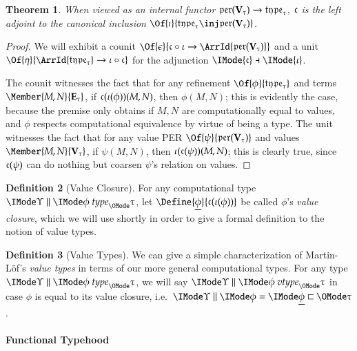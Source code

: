 \documentclass[11pt]{article}
\newtheorem{thm}{Theorem}[section]
\theoremstyle{definition}
\newtheorem{definition}[thm]{Definition}
\theoremstyle{notation}
\theoremstyle{remark}
\numberwithin{equation}{section}
\newcommand\Exprs{\mathbf{E}}
\newcommand\Values{\mathbf{V}}
\begin{document}
\begin{thm}
When viewed as an internal functor
$\PERs{\Values_\tau}\to\Types{\tau}$, $\mathfrak{c}$ is the left adjoint to
the canonical inclusion
$\Of{\iota}{\Types{\tau}\inj\PERs{\Values_\tau}}$.
\end{thm}
\begin{proof}
  We will exhibit a counit $\Of{\epsilon}{\VToCType\circ\iota\to
  \ArrId{\PERs{\Values_\tau}}}$ and a unit
  $\Of{\eta}{\ArrId{\Types{\tau}}\to\iota\circ\VToCType}$ for
  the adjunction $\IMode{\VToCType}\dashv\IMode{\iota}$.

  The counit witnesses the fact that for any refinement
  $\Of{\phi}{\Types{\tau}}$ and terms $\Member{M,N}{\Exprs_\tau}$, if
  $\mathfrak{c}(\iota(\phi))(M,N)$, then $\phi(M,N)$; this is evidently the case,
  because the premise only obtains if $M,N$ are computationally equal to
  values, and $\phi$ respects computational equivalence by virtue of being a
  type.  The unit witnesses the fact that for any value PER
  $\Of{\psi}{\PERs{\Values_\tau}}$ and values $\Member{M,N}{\Values_\tau}$, if
  $\psi(M,N)$, then $\iota(\mathfrak{c}(\psi))(M,N)$; this is clearly true, since
  $\mathfrak{c}(\psi)$ can do nothing but coarsen $\psi$'s relation on values.

\end{proof}

\begin{definition}[Value Closure]
  For any computational type $\IsType{\Upsilon}{\phi}{\tau}$, let
  $\Define{\underline{\phi}}{\VToCType(\iota(\phi))}$ be called $\phi$'s
  \emph{value closure}, which we will use shortly in order to give a formal
  definition to the notion of value types.
\end{definition}

\begin{definition}[Value Types]
  We can give a simple characterization of Martin-L\"of's \emph{value types} in
  terms of our more general computational types. For any type
  $\IsType{\Upsilon}{\phi}{\tau}$, we will say
  $\IsValueType{\Upsilon}{\phi}{\tau}$ in case $\phi$ is equal to its value
  closure, i.e.\ $\EqRefines{\Upsilon}{\phi}{\underline{\phi}}{\tau}$.
\end{definition}

\paragraph{Functional Typehood}
\newcommand\PTyFamNil{\vDash^\textit{type}_{\mathtt{nil}}}
\newcommand\PTyFamSnoc{\vDash^\textit{type}_{\mathtt{snoc}}}
\end{document}

